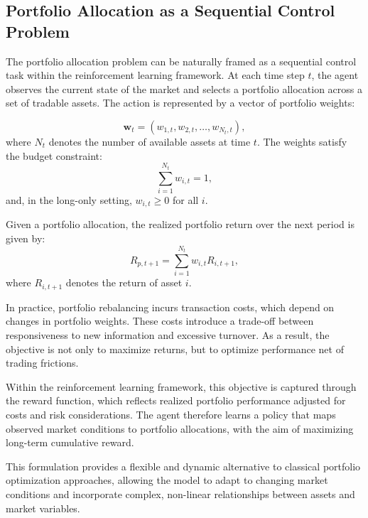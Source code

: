 \documentclass[]{elsarticle}
\begin{document}
\linespread{1.5}\selectfont

\hypertarget{PA_SCP}{%
\subsection{Portfolio Allocation as a Sequential Control Problem}\label{PA_SCP}}

The portfolio allocation problem can be naturally framed as a sequential control task within the reinforcement learning framework. At each time step \(t\), the agent observes the current state of the market and selects a portfolio allocation across a set of tradable assets. The action is represented by a vector of portfolio weights:

\begin{equation}
\mathbf{w}_t = (w_{1,t}, w_{2,t}, \dots, w_{N_t,t}),
\end{equation}
where \(N_t\) denotes the number of available assets at time \(t\). The weights satisfy the budget constraint:
\begin{equation}
\sum_{i=1}^{N_t} w_{i,t} = 1,
\end{equation}
and, in the long-only setting, \(w_{i,t} \geq 0\) for all \(i\).

Given a portfolio allocation, the realized portfolio return over the next period is given by:
\begin{equation}
R_{p,t+1} = \sum_{i=1}^{N_t} w_{i,t} R_{i,t+1},
\end{equation}
where \(R_{i,t+1}\) denotes the return of asset \(i\).

In practice, portfolio rebalancing incurs transaction costs, which depend on changes in portfolio weights. These costs introduce a trade-off between responsiveness to new information and excessive turnover. As a result, the objective is not only to maximize returns, but to optimize performance net of trading frictions.

Within the reinforcement learning framework, this objective is captured through the reward function, which reflects realized portfolio performance adjusted for costs and risk considerations. The agent therefore learns a policy that maps observed market conditions to portfolio allocations, with the aim of maximizing long-term cumulative reward.

This formulation provides a flexible and dynamic alternative to classical portfolio optimization approaches, allowing the model to adapt to changing market conditions and incorporate complex, non-linear relationships between assets and market variables.
\end{document}
